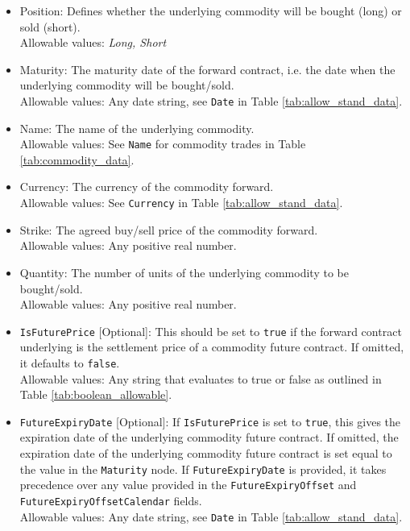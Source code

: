 \begin{itemize}
\item Position: Defines whether the underlying commodity will be bought (long) or sold (short). \\
Allowable values: \emph{Long, Short}

\item Maturity: The maturity date of the forward contract, i.e. the date when the underlying commodity will be bought/sold. \\
Allowable values: Any date string, see \lstinline!Date! in Table \ref{tab:allow_stand_data}.

\item Name: The name of the underlying commodity. \\
Allowable values:  See \lstinline!Name! for commodity trades in Table \ref{tab:commodity_data}. \\

\item Currency: The  currency of the commodity forward. \\
Allowable values:  See \lstinline!Currency! in Table \ref{tab:allow_stand_data}.	

\item Strike: The agreed buy/sell price of the commodity forward. \\
Allowable values:  Any positive real number.

\item Quantity: The number of units of the underlying commodity to be bought/sold. \\
Allowable values:  Any positive real number.

\item \lstinline!IsFuturePrice! [Optional]: This should be set to \lstinline!true! if the forward contract underlying is the settlement price of a commodity future contract. If omitted, it defaults to \lstinline!false!. \\
Allowable values: Any string that evaluates to true or false as outlined in Table \ref{tab:boolean_allowable}.

\item \lstinline!FutureExpiryDate! [Optional]: If \lstinline!IsFuturePrice! is set to \lstinline!true!, this gives the expiration date of the underlying commodity future contract. If omitted, the expiration date of the underlying commodity future contract is set equal to the value in the \lstinline!Maturity! node. If \lstinline!FutureExpiryDate! is provided, it takes precedence over any value provided in the \lstinline!FutureExpiryOffset! and \lstinline!FutureExpiryOffsetCalendar! fields. \\
Allowable values: Any date string, see \lstinline!Date! in Table \ref{tab:allow_stand_data}.


\end{itemize}

